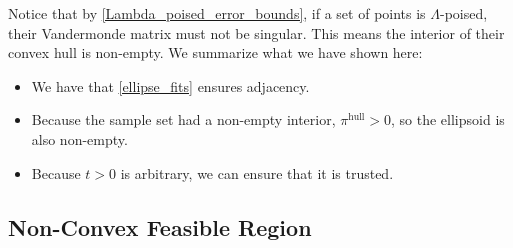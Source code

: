 Notice that by \cref{Lambda_poised_error_bounds}, if a set of points is $\Lambda$-poised, their Vandermonde matrix must not be singular.
This means the interior of their convex hull is non-empty.
We summarize what we have shown here:
\begin{itemize}
\item We have that \cref{ellipse_fits} ensures adjacency.
\item Because the sample set had a non-empty interior, $ \pi^{\textrm{hull}} > 0$, so the ellipsoid is also non-empty.
\item Because $t > 0$ is arbitrary, we can ensure that it is trusted.
\end{itemize}




% 
% 
% 


\subsection{Non-Convex Feasible Region}

